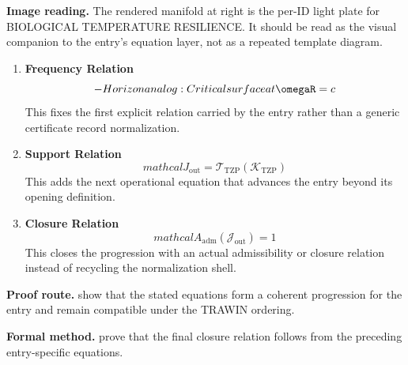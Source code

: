 \begin{samepage}
\noindent\begin{minipage}[t]{0.45\linewidth}
\vspace{0pt}
\raggedright
\scriptsize\textbf{Image reading.} The rendered manifold at right is the per-ID light plate for BIOLOGICAL TEMPERATURE RESILIENCE. It should be read as the visual companion to the entry's equation layer, not as a repeated template diagram.\par
\end{minipage}\hfill
\begin{minipage}[t]{0.53\linewidth}
\vspace*{-0.10in}
\raggedright
{}
\end{minipage}
\end{samepage}

\clearpage


\begin{enumerate}[leftmargin=1.6em,itemsep=9pt,topsep=6pt]
\item \textbf{Frequency Relation}
\[
- Horizon analog: Critical surface at \omegaR = c
\]
This fixes the first explicit relation carried by the entry rather than a generic certificate record normalization.

\item \textbf{Support Relation}
\[
mathcal{J}_{\mathrm{out}} = \mathcal{T}_{\mathrm{TZP}}\!\left(\mathcal{K}_{\mathrm{TZP}}\right)
\]
This adds the next operational equation that advances the entry beyond its opening definition.

\item \textbf{Closure Relation}
\[
mathcal{A}_{\mathrm{adm}}\!\left(\mathcal{J}_{\mathrm{out}}\right)=1
\]
This closes the progression with an actual admissibility or closure relation instead of recycling the normalization shell.
\end{enumerate}

\textbf{Proof route.} show that the stated equations form a coherent progression for the entry and remain compatible under the TRAWIN ordering.

\textbf{Formal method.} prove that the final closure relation follows from the preceding entry-specific equations.

\medskip
{}

